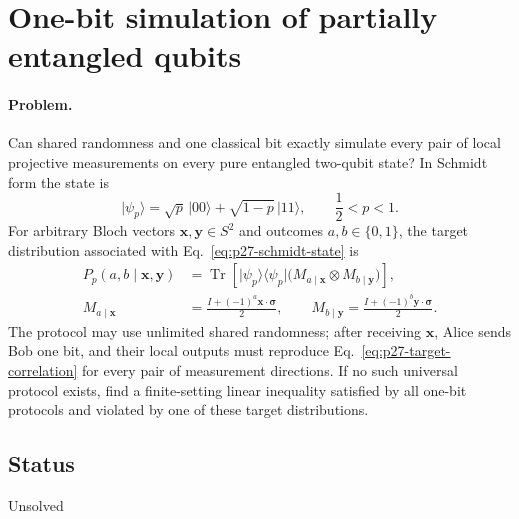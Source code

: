 \section{One-bit simulation of partially entangled qubits}
\label{sec:op_64db785888803dd3}

\paragraph{Problem.}
Can shared randomness and one classical bit exactly simulate every pair of
local projective measurements on every pure entangled two-qubit state?  In
Schmidt form the state is
\begin{equation}
  \lvert\psi_p\rangle
  =\sqrt p\,\lvert00\rangle+\sqrt{1-p}\,\lvert11\rangle,
  \qquad \frac12<p<1.
  \label{eq:p27-schmidt-state}
\end{equation}
For arbitrary Bloch vectors $\mathbf x,\mathbf y\in S^2$ and outcomes
$a,b\in\{0,1\}$, the target distribution associated with
Eq.~\eqref{eq:p27-schmidt-state} is
\begin{equation}
  \begin{aligned}
  P_p(a,b\mid\mathbf x,\mathbf y)
    &=\operatorname{Tr}\!\left[
      \lvert\psi_p\rangle\!\langle\psi_p\rvert
      \bigl(M_{a\mid\mathbf x}\otimes M_{b\mid\mathbf y}\bigr)
      \right],\\
  M_{a\mid\mathbf x}
    &=\frac{I+(-1)^a\mathbf x\cdot\boldsymbol\sigma}{2},
  \qquad
  M_{b\mid\mathbf y}
    =\frac{I+(-1)^b\mathbf y\cdot\boldsymbol\sigma}{2}.
  \end{aligned}
  \label{eq:p27-target-correlation}
\end{equation}
The protocol may use unlimited shared randomness; after receiving
$\mathbf x$, Alice sends Bob one bit, and their local outputs must reproduce
Eq.~\eqref{eq:p27-target-correlation} for every pair of measurement
directions.  If no such universal protocol exists, find a finite-setting
linear inequality satisfied by all one-bit protocols and violated by one of
these target distributions.

\subsection*{Status}

Unsolved

